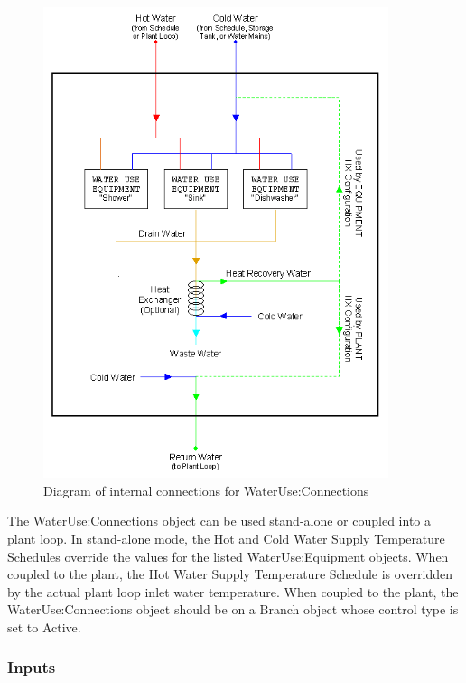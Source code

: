 \begin{figure}[hbtp] %
\centering
\includegraphics[width=0.9\textwidth, height=0.9\textheight, keepaspectratio=true]{media/image579.png}
\caption{Diagram of internal connections for WaterUse:Connections \protect \label{fig:diagram-of-internal-connections-for-wateruse}}
\end{figure}

The WaterUse:Connections object can be used stand-alone or coupled into a plant loop. In stand-alone mode, the Hot and Cold Water Supply Temperature Schedules override the values for the listed WaterUse:Equipment objects. When coupled to the plant, the Hot Water Supply Temperature Schedule is overridden by the actual plant loop inlet water temperature. When coupled to the plant, the WaterUse:Connections object should be on a Branch object whose control type is set to Active.

\subsubsection{Inputs}\label{inputs-1-050}


